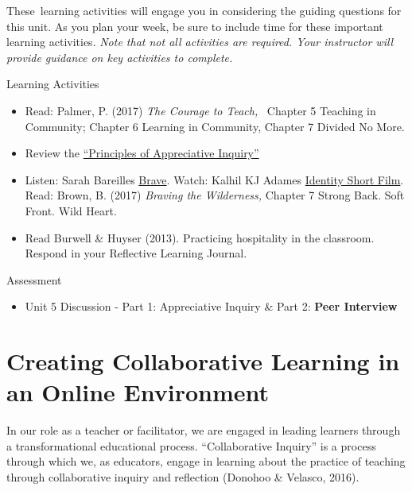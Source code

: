 \documentclass[
]{book}
\providecommand{\tightlist}{%
  \setlength{\itemsep}{0pt}\setlength{\parskip}{0pt}}
\begin{document}
These~learning activities will engage you in considering the guiding questions for this unit. As you plan your week, be sure to include time for these important learning activities. \emph{Note that not all activities are required. Your instructor will provide guidance on key activities to complete.}

\begin{reflect}
{Learning Activities}

\begin{itemize}
\tightlist
\item
  Read: Palmer, P. (2017) \emph{The Courage to Teach,} ~Chapter 5
  Teaching in Community; Chapter 6 Learning in Community, Chapter 7
  Divided No More.\\
\item
  Review the
  \href{https://appreciativeinquiry.champlain.edu/learn/appreciative-inquiry-introduction/5-classic-principles-ai}{``Principles
  of Appreciative Inquiry''}\\
\item
  Listen: Sarah Bareilles
  \href{https://www.youtube.com/watch?v=QUQsqBqxoR4}{Brave}. Watch:
  Kalhil KJ Adames
  \href{https://www.youtube.com/watch?v=ikGVWEvUzNM}{Identity Short
  Film}. Read: Brown, B. (2017) \emph{Braving the Wilderness,} Chapter 7
  Strong Back. Soft Front. Wild Heart.\\
\item
  Read Burwell \& Huyser (2013). Practicing hospitality in the
  classroom. Respond in your Reflective Learning Journal.
\end{itemize}
\end{reflect}

\begin{assessment}
{Assessment}

\begin{itemize}
\tightlist
\item
  Unit 5 Discussion - Part 1: Appreciative Inquiry \& Part 2:
  \textbf{Peer Interview}
\end{itemize}
\end{assessment}

\hypertarget{creating-collaborative-learning-in-an-online-environment}{%
\section{Creating Collaborative Learning in an Online Environment}\label{creating-collaborative-learning-in-an-online-environment}}

In our role as a teacher or facilitator, we are engaged in leading learners through a transformational educational process. ``Collaborative Inquiry'' is a process through which we, as educators, engage in learning about the practice of teaching through collaborative inquiry and reflection (Donohoo \& Velasco, 2016).
\end{document}
